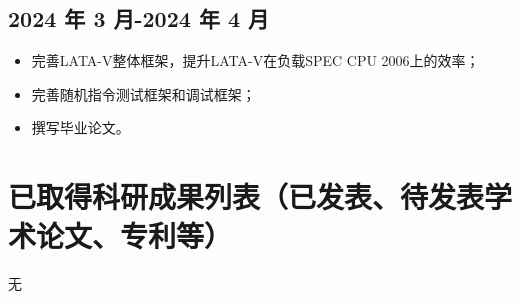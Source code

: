 \subsection*{2024 年 3 月-2024 年 4 月}
\begin{itemize}[left=0pt]
    \item 完善LATA-V整体框架，提升LATA-V在负载SPEC CPU 2006上的效率；
    \item 完善随机指令测试框架和调试框架；
    \item 撰写毕业论文。
\end{itemize}

\section{已取得科研成果列表（已发表、待发表学术论文、专利等）}
无
\nocite{*}%
